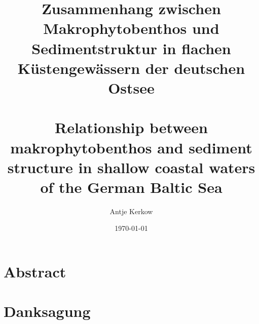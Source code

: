 



\pagestyle{empty}



\titlehead{Ernst Moritz Arndt Universität Greifswald\\
           Fachbereich Naturwissenschaften\\
           Institut für Landschaftsökologie und Naturschutz}

\subject{Diplomarbeit}

\title{Zusammenhang zwischen Makrophytobenthos und Sedimentstruktur in flachen Küstengewässern der deutschen Ostsee\\
\\
Relationship between makrophytobenthos and sediment structure in shallow coastal waters of the German Baltic Sea}

\author{Antje Kerkow}

\date{\today} 

\publishers{Dozenten:\\PD Dr. Irmgard Blindow \\Prof. Dr. Hendrik Schubert}





\maketitle %
\clearpage

\section*{Abstract}

\clearpage

\section*{Danksagung}

\clearpage

